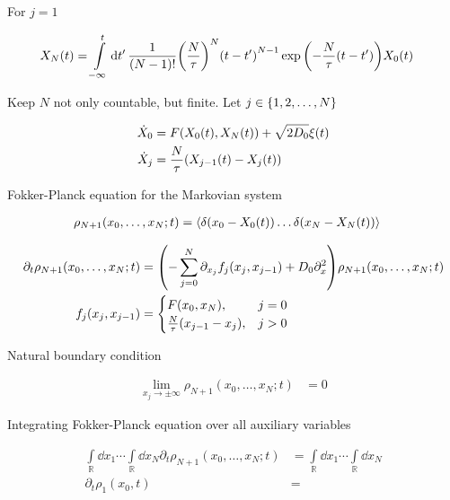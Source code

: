 \documentclass[a4paper,10pt]{article}
\newcommand{\suml}{\sum\limits}
\newcommand{\intl}{\int\limits}
\begin{document}
For $j=1$

\begin{align}
	X_{N}(t)
	&=
	\intl_{-\infty}^t
	\dd{t^\prime}
	\frac{1}{(N-1)!}
	\pqty{
		\frac{N}{\tau}
	}^N
	\pqty{t-t^\prime}^{N-1}
	\exp\pqty{-\frac{N}{\tau}(t-t^\prime)}
	X_{0}(t)
\end{align}

Keep $N$ not only countable, but finite. Let $j\in\Bqty{1,2,\ldots,N}$

\begin{align}
	\dot{X}_0
	&=
	F(X_0(t),X_N(t))
	+
	\sqrt{2D_0}
	\xi(t)
	\\
	\dot{X}_j
	&=
	\frac{N}{\tau}
	\pqty{X_{j-1}(t)-X_{j}(t)}
\end{align}

Fokker-Planck equation for the Markovian system

\begin{align}
	\rho_{N+1}(x_0,\ldots,x_N;t)
	&=
	\expval{
		\delta(x_0-X_0(t))
		\ldots
		\delta(x_N-X_N(t))
	}
\end{align}

\begin{align}
	\partial_t
	\rho_{N+1}(x_0,\ldots,x_N;t)
	&=
	\pqty{
		-
		\suml_{j=0}^N
		\partial_{x_j}
		f_j(x_j,x_{j-1})
		+
		D_0
		\partial_x^2
	}
	\rho_{N+1}(x_0,\ldots,x_N;t)
\\
	f_j(x_j,x_{j-1})
	&=
	\begin{cases}
		F(x_0,x_N),&j=0
		\\
		\frac{N}{\tau}
		\pqty{x_{j-1}-x_j},&j>0
	\end{cases}
\end{align}

Natural boundary condition

\begin{align}
	\lim\limits_{x_j\to\pm\infty}
	\rho_{N+1}(x_0,\ldots,x_N;t)
	&=
	0
\end{align}

Integrating Fokker-Planck equation over all auxiliary variables

\begin{align}
	\intl_\mathbb{R}
	\dd{x_1}
	\cdots
	\intl_\mathbb{R}
	\dd{x_N}
	\partial_t
	\rho_{N+1}(x_0,\ldots,x_N;t)
	&=
	\intl_\mathbb{R}
	\dd{x_1}
	\cdots
	\intl_\mathbb{R}
	\dd{x_N}
\\
	\partial_t
	\rho_1(x_0,t)
	&=
\end{align}
\end{document}
